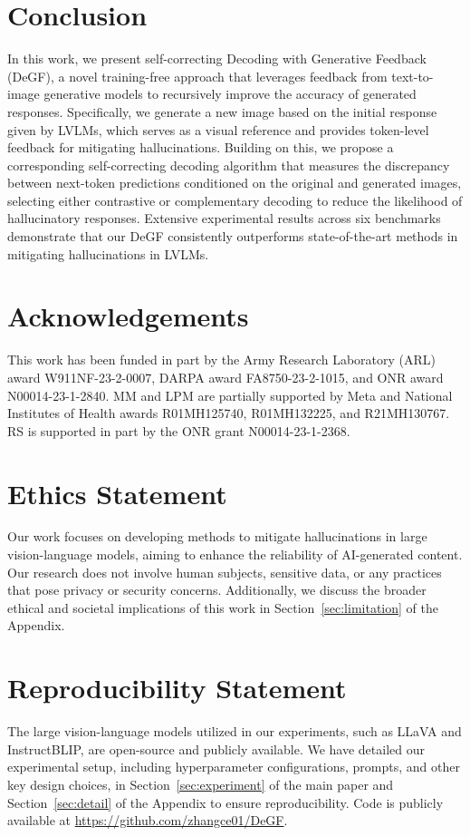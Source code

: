 \section{Conclusion}
In this work, we present self-correcting Decoding with Generative Feedback (DeGF), a novel training-free approach that leverages feedback from text-to-image generative models to recursively improve the accuracy of generated responses. Specifically, we generate a new image based on the initial response given by LVLMs, which serves as a visual reference and provides token-level feedback for mitigating hallucinations. Building on this, we propose a corresponding self-correcting decoding algorithm that measures the discrepancy between next-token predictions conditioned on the original and generated images, selecting either contrastive or complementary decoding to reduce the likelihood of hallucinatory responses. Extensive experimental results across six benchmarks demonstrate that our DeGF consistently outperforms state-of-the-art methods in mitigating hallucinations in LVLMs.


\clearpage

\section*{Acknowledgements}
This work has been funded in part by the Army Research Laboratory (ARL) award W911NF-23-2-0007, DARPA award FA8750-23-2-1015, and ONR award N00014-23-1-2840. MM and LPM are partially supported by Meta and National Institutes of Health awards R01MH125740, R01MH132225, and R21MH130767. RS is supported in part by the ONR grant N00014-23-1-2368.

\section*{Ethics Statement}
Our work focuses on developing methods to mitigate hallucinations in large vision-language models, aiming to enhance the reliability of AI-generated content. Our research does not involve human subjects, sensitive data, or any practices that pose privacy or security concerns. Additionally, we discuss the broader ethical and societal implications of this work in Section~\ref{sec:limitation} of the Appendix.

\section*{Reproducibility Statement}
The large vision-language models utilized in our experiments, such as LLaVA and InstructBLIP, are open-source and publicly available. We have detailed our experimental setup, including hyperparameter configurations, prompts, and other key design choices, in Section~\ref{sec:experiment} of the main paper and Section~\ref{sec:detail} of the Appendix to ensure reproducibility. Code is publicly available at \url{https://github.com/zhangce01/DeGF}.